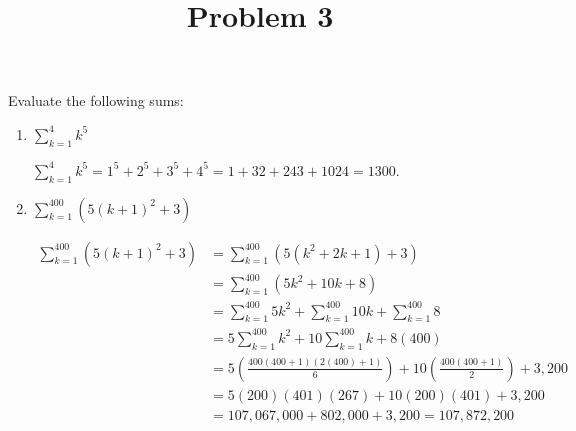 \documentclass{ximera}
\title[Problem 3]{Problem 3}
\begin{document}
\begin{abstract} \end{abstract}
\maketitle


\begin{problem}
  Evaluate the following sums:
  \begin{enumerate}
  \item $\displaystyle \sum_{k=1}^{4} k^5 $
    \begin{explanation}
      $\displaystyle \sum_{k=1}^{4}k^5 = 1^5 + 2^5 + 3^5 + 4^5 = 1 + 32 + 243 +
      1024 = 1300$.
    \end{explanation}

\item $\displaystyle \sum_{k=1}^{400} (5(k+1)^2 + 3) $
    \begin{explanation}
      \begin{align*}
        \displaystyle \sum_{k=1}^{400} (5(k+1)^2 + 3) 
        &= \displaystyle \sum_{k=1}^{400} (5(k^2 + 2k + 1) + 3) \\
        &= \displaystyle \sum_{k=1}^{400} (5k^2 + 10k + 8) \\
        &= \displaystyle \sum_{k=1}^{400} 5k^2 + \displaystyle \sum_{k=1}^{400} 10k + \displaystyle \sum_{k=1}^{400} 8  \\
        &= 5\displaystyle \sum_{k=1}^{400}k^2 + 10 \displaystyle \sum_{k=1}^{400} k + 8(400)  \\
        &= 5 \left( \frac{400(400+1)(2(400) + 1)}{6} \right) + 10 \left( \frac{400(400+1)}{2} \right) + 3,200  \\
        &= 5 (200)(401)(267) + 10(200)(401) + 3,200  \\
        &= 107,067,000 + 802,000 + 3,200 = 107,872,200
      \end{align*}
    \end{explanation}
\end{enumerate}
\end{problem}
\end{document}
